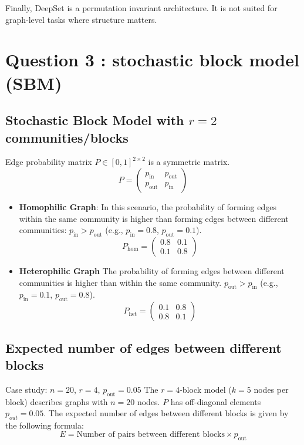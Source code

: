 \documentclass[a4paper]{article}
\begin{document}
Finally, DeepSet is a permutation invariant architecture. It is not suited for graph-level tasks where structure matters.

\break

\section*{Question 3 : stochastic block model (SBM)}
\subsection*{Stochastic Block Model with $r=2$ communities/blocks}
Edge probability matrix $ P \in {[0, 1]}^{2\times 2}$ is a symmetric matrix.
\[ P = \begin{pmatrix} p_{\text{in}} &  p_{\text{out}} \\ p_{\text{out}} &  p_{\text{in}} \end{pmatrix} \]

\begin{itemize}
    \item \textbf{Homophilic Graph}: In this scenario, the probability of forming edges within the same community is higher than forming edges between different communities: $ p_\text{in} > p_{\text{out}}$
    (e.g., \( p_\text{in} = 0.8 \), \( p_\text{out} = 0.1 \)).
    \[ P_{\text{hom}} = \begin{pmatrix} 0.8 & 0.1 \\ 0.1 & 0.8 \end{pmatrix} \]
    \item \textbf{Heterophilic Graph} The probability of forming edges between different communities is higher than within the same community.  $ p_\text{out} > p_{\text{in}}$
    (e.g., \( p_\text{in} = 0.1 \), \( p_\text{out} = 0.8 \)).
    \[ P_{\text{het}} = \begin{pmatrix} 0.1 & 0.8 \\ 0.8 & 0.1 \end{pmatrix} \]
\end{itemize}


\subsection*{Expected number of edges between different blocks}
Case study: $n=20$, $r=4$, $p_{\text{out}}=0.05$
The $r=4$-block model ($k=5$ nodes per block) describes graphs with $n=20$ nodes. $P$ has off-diagonal elements $p_{out}=0.05$.
The expected number of edges between different blocks is given by the following formula:
$$ E = \text{Number of pairs between different blocks} \times p_{\text{out}}$$
\end{document}
